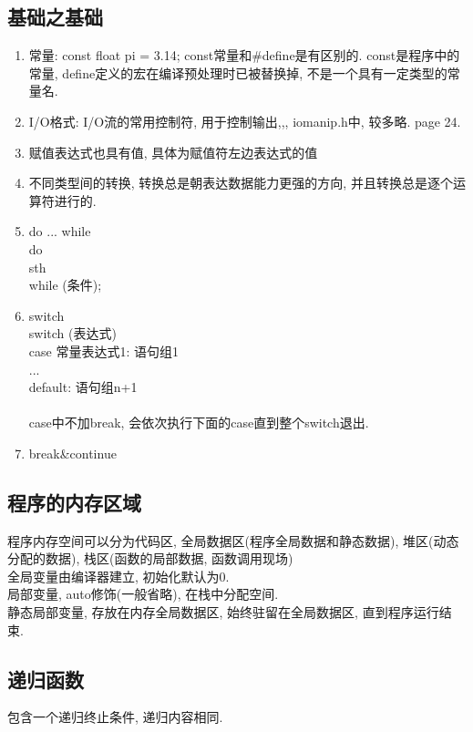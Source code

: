 \documentclass[a4paper,10pt,english]{article}
\begin{document}
\subsection{基础之基础}
\begin{enumerate}
\item {常量}: const float pi = 3.14; const常量和\#define是有区别的. const是程序中的常量, define定义的宏在编译预处理时已被替换掉, 不是一个具有一定类型的常量名.

\item {I/O格式}: I/O流的常用控制符, 用于控制输出,,, iomanip.h中, 较多略. page 24.

\item {赋值表达式也具有值, 具体为赋值符左边表达式的值}

\item {不同类型间的转换, 转换总是朝表达数据能力更强的方向, 并且转换总是逐个运算符进行的.}

\item {do ... while} \\
do { \\
sth \\
}while (条件); \\

\item {switch} \\
switch (表达式) {\\
case 常量表达式1: 语句组1 \\
...\\
default: 语句组n+1\\
}\\
case中不加break, 会依次执行下面的case直到整个switch退出.

\item {break\&continue}

\end{enumerate}

\subsection {程序的内存区域}
程序内存空间可以分为代码区, 全局数据区(程序全局数据和静态数据), 堆区(动态分配的数据), 栈区(函数的局部数据, 函数调用现场) \\
全局变量由编译器建立, 初始化默认为0. \\
局部变量, auto修饰(一般省略), 在栈中分配空间. \\
静态局部变量, 存放在内存全局数据区, 始终驻留在全局数据区, 直到程序运行结束. 

\subsection {递归函数}
包含一个递归终止条件, 递归内容相同. 
\end{document}
